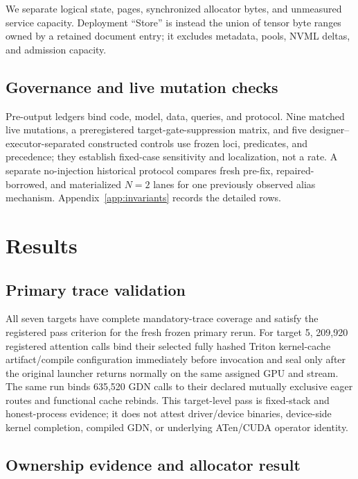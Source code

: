 \documentclass{article}
\begin{document}
We separate logical state, pages, synchronized allocator bytes, and unmeasured
service capacity.  Deployment ``Store'' is instead the union of tensor byte
ranges owned by a retained document entry; it excludes metadata, pools, NVML
deltas, and admission capacity.

\subsection{Governance and live mutation checks}

Pre-output ledgers bind code, model, data, queries, and protocol.  Nine matched
live mutations, a preregistered target-gate-suppression matrix, and five
designer--executor-separated constructed controls use frozen loci, predicates,
and precedence; they establish fixed-case sensitivity and localization, not a
rate.  A separate no-injection historical protocol compares fresh pre-fix,
repaired-borrowed, and materialized $N=2$ lanes for one previously observed
alias mechanism.  Appendix~\ref{app:invariants} records the detailed rows.

\section{Results}
\label{sec:results}

\subsection{Primary trace validation}
\label{sec:target-status}

All seven targets have complete mandatory-trace coverage and satisfy the
registered pass criterion for the fresh frozen primary rerun.  For target 5,
209,920 registered attention calls bind their selected fully hashed Triton
kernel-cache artifact/compile configuration immediately before invocation and
seal only after the original launcher returns normally on the same assigned
GPU and stream.  The same run binds 635,520 GDN
calls to their declared mutually exclusive eager routes and functional cache
rebinds.  This target-level pass is fixed-stack and honest-process evidence;
it does not attest driver/device binaries, device-side kernel completion,
compiled GDN, or underlying ATen/CUDA operator identity.

\subsection{Ownership evidence and allocator result}
\end{document}
